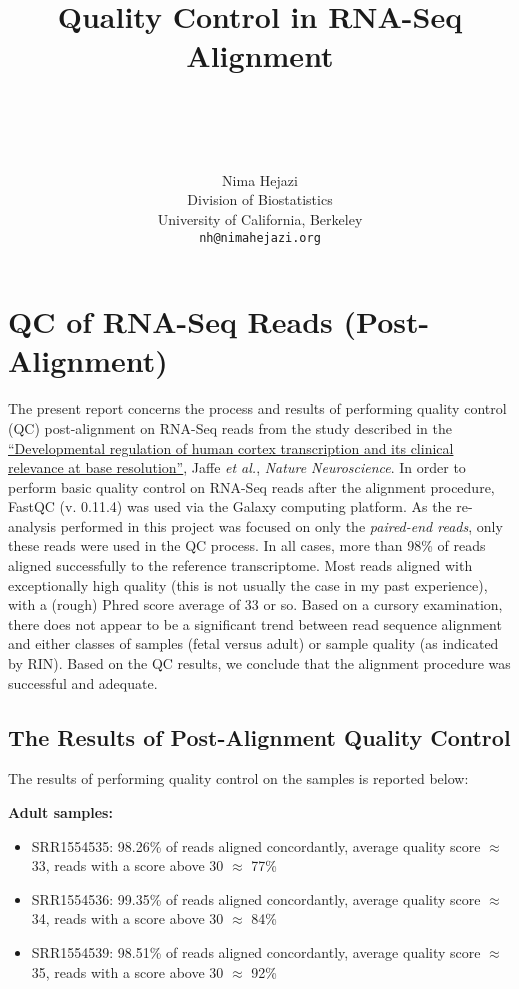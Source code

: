 \documentclass[paper=a4, fontsize=11pt]{scrartcl} %
\title{ \vspace{-1in} \usefont{OT1}{bch}{b}{n}
\huge \strut Quality Control in RNA-Seq Alignment \strut \\
\Large \bfseries \strut \strut
}
\author{ \usefont{OT1}{bch}{m}{n}
        Nima Hejazi\\ \usefont{OT1}{bch}{m}{n}
        Division of Biostatistics\\
        University of California, Berkeley\\ \usefont{OT1}{bch}{m}{n}
        \texttt{nh@nimahejazi.org}
}
\date{}
\begin{document}
\maketitle
\section{QC of RNA-Seq Reads (Post-Alignment)}
The present report concerns the process and results of performing quality
control (QC) post-alignment on RNA-Seq reads from the study described in the
{\href{http://www.nature.com/neuro/journal/v18/n1/abs/nn.3898.html}{``Developmental
regulation of human cortex transcription and its clinical relevance at base
resolution''}}, Jaffe \textit{et al.}, \textit{Nature Neuroscience}. In order to
perform basic quality control on RNA-Seq reads after the alignment procedure,
FastQC (v. 0.11.4) was used via the Galaxy computing platform. As the
re-analysis performed in this project was focused on only the \textit{paired-end
reads}, only these reads were used in the QC process. In all cases, more than
98\% of reads aligned successfully to the reference transcriptome. Most reads
aligned with exceptionally high quality (this is not usually the case in my past
experience), with a (rough) Phred score average of 33 or so. Based on a cursory
examination, there does not appear to be a significant trend between read
sequence alignment and either classes of samples (fetal versus adult) or sample
quality (as indicated by RIN). Based on the QC results, we conclude that the
alignment procedure was successful and adequate.

\subsection{The Results of Post-Alignment Quality Control}
The results of performing quality control on the samples is reported below:

\textbf{Adult samples:}
\begin{itemize}
    \item SRR1554535: 98.26\% of reads aligned concordantly, average quality
      score $\approx$ 33, reads with a score above 30 $\approx$ 77\%
    \item SRR1554536: 99.35\% of reads aligned concordantly, average quality
      score $\approx$ 34, reads with a score above 30 $\approx$ 84\%
    \item SRR1554539: 98.51\% of reads aligned concordantly, average quality
      score $\approx$ 35, reads with a score above 30 $\approx$ 92\%
\end{itemize}
\end{document}
